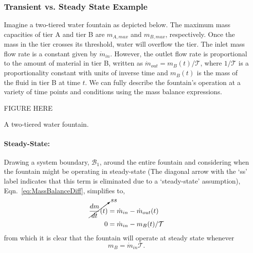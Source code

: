 \documentclass{article}
\begin{document}
\subsubsection{Transient vs. Steady State Example}

Imagine a two-tiered water fountain as depicted below. The maximum mass capacities of tier A and tier B are $m_{A,max}$ and $m_{B,max}$, respectively. Once the mass in the tier crosses its threshold, water will overflow the tier. The inlet mass flow rate is a constant given by $\dot{m}_{in}$. However, the outlet flow rate is proportional to the amount of material in tier B, written as $\dot{m}_{out} = m_B(t)/\mathcal{T}$, where $1/\mathcal{T}$ is a proportionality constant with units of inverse time and $m_B(t)$ is the mass of the fluid in tier B at time $t$. We can fully describe the fountain's operation at a variety of time points and conditions using the mass balance expressions.

\color{red} FIGURE HERE

\caption{A two-tiered water fountain.}\label{fig:Waterfountain}


\paragraph{Steady-State:}
Drawing a system boundary, $\mathcal{B}_1$, around the entire fountain and considering when the fountain might be operating in steady-state (The diagonal arrow with the `ss' label indicates that this term is eliminated due to a `steady-state' assumption), Eqn.~\eqref{eq:MassBalanceDiff}, simplifies to,
\begin{equation}
\begin{split}
\cancelto{ss}{\frac{dm}{dt}(t)} &= \dot{m}_{in} - \dot{m}_{out}(t) \\
0 &= \dot{m}_{in} -  m_B(t)/\mathcal{T}
\end{split}
\end{equation}
from which it is clear that the fountain will operate at steady state whenever 
\begin{equation}\label{eq:SS_mB}
m_{B} = \dot{m}_{in}\mathcal{T}. 
\end{equation}
\end{document}
